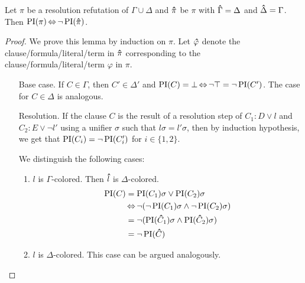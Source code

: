 \begin{lemma}
	\label{lemma:symmetry}
	Let $\pi$ be a resolution refutation of $\Gamma \cup \Delta$ and
	$\bm\hat{\pi}$ be $\pi$ with $\bm\hat{\Gamma} = \Delta$ and $\bm\hat{\Delta} = \Gamma$.
	Then $\operatorname{PI}(\pi) \operatorname{\Leftrightarrow} \lnot \operatorname{PI}(\bm\hat{\pi})$.
\end{lemma}
\begin{proof}
	We prove this lemma by induction on $\pi$.
	Let $\bm\hat{\varphi}$ denote the clause/formula/literal/term in $\bm\hat{\pi}$ corresponding to the clause/formula/literal/term $\varphi$ in $\pi$.

	\newcommand{\p}[1]{\primex{#1}}
	\begin{itemize}
		\item[Base case.]
			If $C \in \Gamma$, then $C' \in \Delta'$ and $\operatorname{PI}(C) = \bot \operatorname{\Leftrightarrow} \lnot \top = \lnot \operatorname{PI}(C')$. 
			The case for $C\in \Delta$ is analogous.

		\item[Resolution.]
			If the clause $C$ is the result of a resolution step of $C_1: D \lor l$ and $C_2: E \lor \lnot l'$ using a unifier $\sigma$ such that $l\sigma = l'\sigma$, then by induction hypothesis, we get that
			$\operatorname{PI}(C_i) = \lnot \operatorname{PI}(C'_i)$ for $i\in \{1,2\}$.

			We distinguish the following cases:
			\begin{enumerate}
				\item $l$ is $\Gamma$-colored. Then $\bm\hat{l}$ is $\Delta$-colored.
					\begin{align*}
						\operatorname{PI}(C) &= \operatorname{PI}(C_1)\sigma \lor \operatorname{PI}(C_2)\sigma\\
													&\operatorname{\Leftrightarrow} \lnot ( \lnot \operatorname{PI}(C_1)\sigma \land \lnot \operatorname{PI}(C_2)\sigma )\\
													&= \lnot ( \operatorname{PI}(\bm\hat{C}_1)\sigma \land \operatorname{PI}(\bm\hat{C}_2)\sigma ) \\
													&= \lnot \operatorname{PI}(\bm\hat{C})  
					\end{align*}
				\item $l$ is $\Delta$-colored. This case can be argued analogously.


\end{enumerate}
\end{itemize}
\end{proof}
